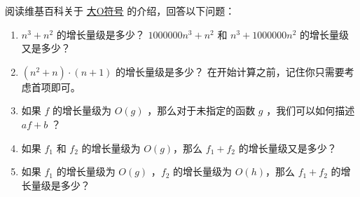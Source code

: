 \begin{exercise}


阅读维基百科关于 \href{http://en.wikipedia.org/wiki/Big_O_notation}{大O符号} 的介绍，回答以下问题：


\begin{enumerate}

\item $n^3 + n^2$ 的增长量级是多少？  $1000000 n^3 + n^2$ 和 $n^3 + 1000000 n^2$ 的增长量级又是多少？


\item $(n^2 + n) \cdot (n + 1)$ 的增长量级是多少？  在开始计算之前，记住你只需要考虑首项即可。


\item 如果 $f$ 的增长量级为 $O(g)$ ，那么对于未指定的函数 $g$ ，我们可以如何描述 $af+b$ ？


\item 如果 $f_1$ 和 $f_2$ 的增长量级为 $O(g)$，那么 $f_1 + f_2$ 的增长量级又是多少？


\item 如果 $f_1$ 的增长量级为 $O(g)$ ，$f_2$ 的增长量级为 $O(h)$，那么 $f_1 + f_2$ 的增长量级是多少？

\end{enumerate}

\end{exercise}

